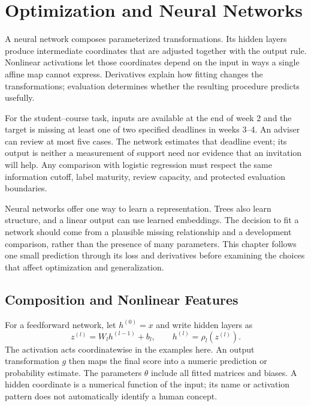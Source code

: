 \begingroup
\raggedbottom
{}
\chapter{Optimization and Neural Networks}
\label{ch:optimization-neural-networks}

A neural network composes parameterized transformations. Its hidden layers produce intermediate coordinates that are adjusted together with the output rule. Nonlinear activations let those coordinates depend on the input in ways a single affine map cannot express. Derivatives explain how fitting changes the transformations; evaluation determines whether the resulting procedure predicts usefully.

For the student--course task, inputs are available at the end of week 2 and the target is missing at least one of two specified deadlines in weeks 3--4. An adviser can review at most five cases. The network estimates that deadline event; its output is neither a measurement of support need nor evidence that an invitation will help. Any comparison with logistic regression must respect the same information cutoff, label maturity, review capacity, and protected evaluation boundaries.

Neural networks offer one way to learn a representation. Trees also learn structure, and a linear output can use learned embeddings. The decision to fit a network should come from a plausible missing relationship and a development comparison, rather than the presence of many parameters. This chapter follows one small prediction through its loss and derivatives before examining the choices that affect optimization and generalization.

\section{Composition and Nonlinear Features}

For a feedforward network, let $h^{(0)}=x$ and write hidden layers as
\[
z^{(l)}=W_lh^{(l-1)}+b_l,
\qquad h^{(l)}=\rho_l(z^{(l)}).
\]
The activation acts coordinatewise in the examples here. An output transformation $g$ then maps the final score into a numeric prediction or probability estimate. The parameters $\theta$ include all fitted matrices and biases. A hidden coordinate is a numerical function of the input; its name or activation pattern does not automatically identify a human concept.

